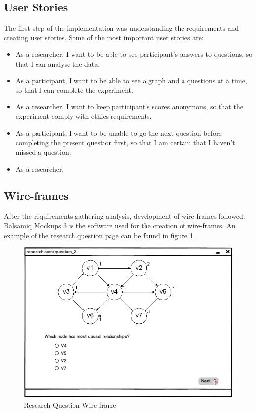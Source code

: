 \documentclass{l4proj}
\begin{document}
\subsection{User Stories}

The first step of the implementation was understanding the requirements and creating user stories. Some of the most important user stories are:

\begin{itemize}
   \item As a researcher, I want to be able to see participant's answers to questions, so that I can analyse the data.
   \item As a participant, I want to be able to see a graph and a questions at a time, so that I can complete the experiment.
   \item As a researcher, I want to keep participant's scores anonymous, so that the experiment comply with ethics requirements.
   \item As a participant, I want to be unable to go the next question before completing the present question first, so that I am certain that I haven't missed a question.
   \item As a researcher,
\end{itemize}

\subsection{Wire-frames}
After the requirements gathering analysis, development of wire-frames followed. Balsamiq Mockups 3 is the software used for the creation of wire-frames. An example of the research question page can be found in figure \ref{researchQuestion}.

\begin{figure}[H]
\centering
\includegraphics[]{researchQuestion.PNG}
\caption{Research Question Wire-frame}
\label{researchQuestion}
\end{figure}
 
\end{document}

